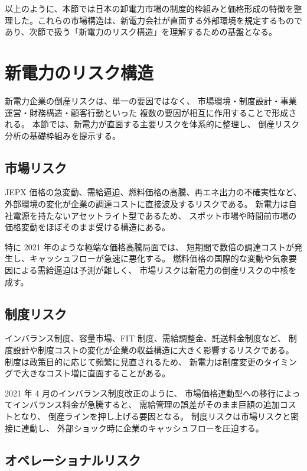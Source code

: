以上のように、本節では日本の卸電力市場の制度的枠組みと価格形成の特徴を整理した。これらの市場構造は、新電力会社が直面する外部環境を規定するものであり、次節で扱う「新電力のリスク構造」を理解するための基盤となる。



\section{新電力のリスク構造}

新電力企業の倒産リスクは、単一の要因ではなく、
市場環境・制度設計・事業運営・財務構造・顧客行動といった
複数の要因が相互に作用することで形成される。
本節では、新電力が直面する主要リスクを体系的に整理し、
倒産リスク分析の基礎枠組みを提示する。

\subsection{市場リスク}

JEPX 価格の急変動、需給逼迫、燃料価格の高騰、再エネ出力の不確実性など、
外部環境の変化が企業の調達コストに直接波及するリスクである。
新電力は自社電源を持たないアセットライト型であるため、
スポット市場や時間前市場の価格変動をほぼそのまま受ける構造にある。

特に 2021 年のような極端な価格高騰局面では、
短期間で数倍の調達コストが発生し、キャッシュフローが急速に悪化する。
燃料価格の国際的な変動や気象要因による需給逼迫は予測が難しく、
市場リスクは新電力の倒産リスクの中核を成す。

\subsection{制度リスク}

インバランス制度、容量市場、FIT 制度、需給調整金、託送料金制度など、
制度設計や制度コストの変化が企業の収益構造に大きく影響するリスクである。
制度は政策目的に応じて頻繁に見直されるため、
新電力は制度変更のタイミングで大きなコスト増に直面することがある。

2021 年 4 月のインバランス制度改正のように、
市場価格連動型への移行によってインバランス料金が急騰すると、
需給管理の誤差がそのまま巨額の追加コストとなり、
倒産ラインを押し上げる要因となる。
制度リスクは市場リスクと密接に連動し、
外部ショック時に企業のキャッシュフローを圧迫する。

\subsection{オペレーショナルリスク}

